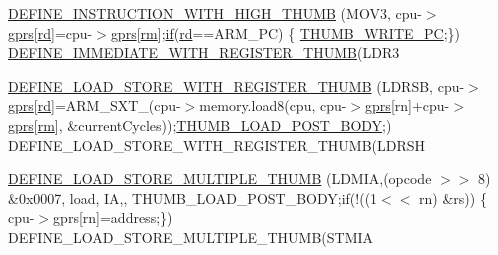 \begin{DoxyCompactItemize}
\item 
\mbox{\hyperlink{isa-thumb_8c_ab36e8aef2323fa97d75079852c3265d0}{D\+E\+F\+I\+N\+E\+\_\+\+I\+N\+S\+T\+R\+U\+C\+T\+I\+O\+N\+\_\+\+W\+I\+T\+H\+\_\+\+H\+I\+G\+H\+\_\+\+T\+H\+U\+MB}} (M\+O\+V3, cpu-\/$>$\mbox{\hyperlink{isa-thumb_8c_a6b4b7e13a9a144391615b217c5917bc7}{gprs}}\mbox{[}\mbox{\hyperlink{isa-arm_8c_a555541ce18ed9b5fad657a06b22cb465}{rd}}\mbox{]}=cpu-\/$>$\mbox{\hyperlink{isa-thumb_8c_a6b4b7e13a9a144391615b217c5917bc7}{gprs}}\mbox{[}\mbox{\hyperlink{isa-thumb_8c_a20e40d2fb8c51fa4dd2b4449ad32e111}{rm}}\mbox{]};\mbox{\hyperlink{isa-lr35902_8c_a2eb27369cb3dbac14564f95cd51effdf}{if}}(\mbox{\hyperlink{isa-arm_8c_a555541ce18ed9b5fad657a06b22cb465}{rd}}==A\+R\+M\+\_\+\+PC) \{ \mbox{\hyperlink{isa-thumb_8c_a94ae991d0d338d43766e37c259589656}{T\+H\+U\+M\+B\+\_\+\+W\+R\+I\+T\+E\+\_\+\+PC}};\}) \mbox{\hyperlink{isa-thumb_8c_a27d6bec3e41a99b34e244e6dd3ae7505}{D\+E\+F\+I\+N\+E\+\_\+\+I\+M\+M\+E\+D\+I\+A\+T\+E\+\_\+\+W\+I\+T\+H\+\_\+\+R\+E\+G\+I\+S\+T\+E\+R\+\_\+\+T\+H\+U\+MB}}(L\+D\+R3
\item 
\mbox{\hyperlink{isa-thumb_8c_a3d6e78836df1e5fef9023e8f1228248e}{D\+E\+F\+I\+N\+E\+\_\+\+L\+O\+A\+D\+\_\+\+S\+T\+O\+R\+E\+\_\+\+W\+I\+T\+H\+\_\+\+R\+E\+G\+I\+S\+T\+E\+R\+\_\+\+T\+H\+U\+MB}} (L\+D\+R\+SB, cpu-\/$>$\mbox{\hyperlink{isa-thumb_8c_a6b4b7e13a9a144391615b217c5917bc7}{gprs}}\mbox{[}\mbox{\hyperlink{isa-arm_8c_a555541ce18ed9b5fad657a06b22cb465}{rd}}\mbox{]}=A\+R\+M\+\_\+\+S\+X\+T\+\_(cpu-\/$>$memory.\+load8(cpu, cpu-\/$>$\mbox{\hyperlink{isa-thumb_8c_a6b4b7e13a9a144391615b217c5917bc7}{gprs}}\mbox{[}rn\mbox{]}+cpu-\/$>$\mbox{\hyperlink{isa-thumb_8c_a6b4b7e13a9a144391615b217c5917bc7}{gprs}}\mbox{[}\mbox{\hyperlink{isa-thumb_8c_a20e40d2fb8c51fa4dd2b4449ad32e111}{rm}}\mbox{]}, \&current\+Cycles));\mbox{\hyperlink{isa-thumb_8c_a9438645a9cdcda0203c3769a4658e9b1}{T\+H\+U\+M\+B\+\_\+\+L\+O\+A\+D\+\_\+\+P\+O\+S\+T\+\_\+\+B\+O\+DY}};) D\+E\+F\+I\+N\+E\+\_\+\+L\+O\+A\+D\+\_\+\+S\+T\+O\+R\+E\+\_\+\+W\+I\+T\+H\+\_\+\+R\+E\+G\+I\+S\+T\+E\+R\+\_\+\+T\+H\+U\+MB(L\+D\+R\+SH
\item 
\mbox{\hyperlink{isa-thumb_8c_ab8cda3a2063c0e7633d6c504961bb608}{D\+E\+F\+I\+N\+E\+\_\+\+L\+O\+A\+D\+\_\+\+S\+T\+O\+R\+E\+\_\+\+M\+U\+L\+T\+I\+P\+L\+E\+\_\+\+T\+H\+U\+MB}} (L\+D\+M\+IA,(opcode $>$$>$ 8) \&0x0007, load, I\+A,, T\+H\+U\+M\+B\+\_\+\+L\+O\+A\+D\+\_\+\+P\+O\+S\+T\+\_\+\+B\+O\+D\+Y;if(!((1$<$$<$ rn) \&rs)) \{ cpu-\/$>$gprs\mbox{[}rn\mbox{]}=address;\}) D\+E\+F\+I\+N\+E\+\_\+\+L\+O\+A\+D\+\_\+\+S\+T\+O\+R\+E\+\_\+\+M\+U\+L\+T\+I\+P\+L\+E\+\_\+\+T\+H\+U\+M\+B(\+S\+T\+M\+IA

\end{DoxyCompactItemize}

